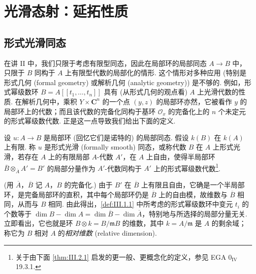 ﻿%
\chapter{光滑态射：延拓性质}

\section{形式光滑同态}

在讲 II 中，我们只限于考虑有限型同态，因此在局部环的局部同态 $A \to B$ 中，只限于 $B$ 同构于 $A$ 上有限型代数的局部化的情形. 这个情形对多种应用 (特别是形式几何 (formal geometry) 或解析几何 (analytic geometry)) 是不够的. 例如，形式幂级数环 $B = A[\![t_1, \dots, t_n]\!]$ 具有 (从形式几何的观点看) $A$ 上光滑代数的性质. 在解析几何中，乘积 $Y \times \mathbf{C}^n$ 的一个点 $(y, z)$ 的局部环亦然，它被看作 $y$ 的局部环上的代数；而且该代数的完备化同构于基环 $\mathcal{O}_x$ 的完备化上的 $n$ 个未定元的形式幂级数代数. 正是这一点导致我们给出下面的定义.

\begin{definition}\label{def:III.1.1}
设 $u \colon A \to B$ 是局部环 (回忆它们是诺特的) 的局部同态. 假设 $k(B)$ 在 $k(A)$ 上有限. 称 $u$ 是形式光滑 (formally smooth) 同态，或称代数 $B$ 在 $A$ 上形式光滑，若存在 $A$ 上的有限局部 $A$-代数 $A'$，在 $A$ 上自由，使得半局部环 $\overline{B} \otimes_{\overline{A}} A' = B'$ 的局部分量作为 $A'$-代数同构于 $A'$ 上的形式幂级数代数\footnote{关于由下面 \ref{thm:III.2.1} 启发的更一般、更概念化的定义，参见 EGA 0$_{\mathrm{IV}}$ 19.3.1.}.
\end{definition}

(用 $\overline{A}$，$\overline{B}$ 记 $A$，$B$ 的完备化.) 由于 $B'$ 在 $\overline{B}$ 上有限且自由，它确是一个半局部环，是完备局部环的直积，其中每个局部环仍是 $\overline{B}$ 上的自由模，故维数与 $\overline{B}$ 相同，从而与 $B$ 相同. 由此得出，\ref{def:III.1.1} 中所考虑的形式幂级数环中变元 $t_i$ 的个数等于 $\dim B - \dim A = \dim \overline{B} - \dim \overline{A}$，特别地与所选择的局部分量无关. 立即看出，它也就是环 $B \otimes k = B/\mathfrak{m}B$ 的维数，其中 $k = A/\mathfrak{m}$ 是 $A$ 的剩余域；称它为 $B$ 相对 $A$ 的\emph{相对维数} (relative dimension).

